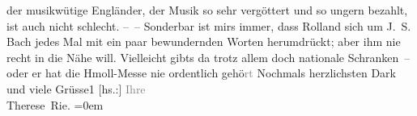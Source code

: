 \begin{ledgroupsized}[t]{13cm}
               der musikwütige Engländer, der Musik so sehr
               vergöttert und so ungern bezahlt, ist auch nicht schlecht.\pend
           \pstart
           – – Sonderbar ist mirs immer, dass Rolland
               sich um J. S. Bach jedes Mal mit ein paar
               bewundernden Worten herumdrückt; aber ihm nie recht in die Nähe will. Vielleicht
               gibts da trotz allem doch nationale Schranken – oder er hat die Hmoll-Messe nie ordentlich gehö\textcolor{gray}{rt}\pend
           \pstart
           Nochmals herzlichsten Dark und viele Grüsse1\pend
           \pstart
           {[}hs.:{]} \textcolor{gray}{Ihre}{\\[\baselineskip]}\spacefill\mbox{Therese Rie.}\pend
           \leftskip=0em{}
         
         \endnumbering{}\end{ledgroupsized}  \newcommand{\dateiname}{L02576}\newcommand{\titel}{Therese Rie-Andro an Arthur Schnitzler, 30. 9. 1923}\newcommand{\editorInnen}{Martin Anton Müller und Gerd-Hermann Susen}
      